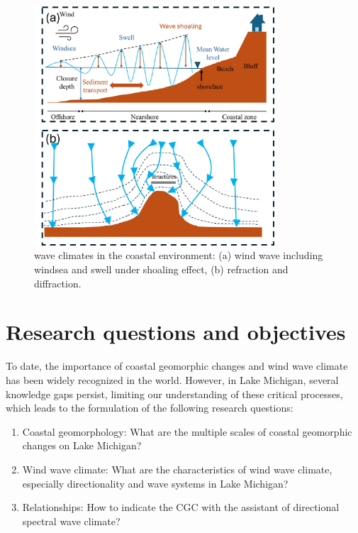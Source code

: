 \begin{figure}[htbp]
  \centering
  \includegraphics[width=0.8\textwidth]{chapter1/resources/figure1-5.jpg}
  \caption{wave climates in the coastal environment: (a) wind wave including windsea and swell under shoaling effect, (b) refraction and diffraction.}
  \label{fig:fig1.5}
\end{figure}


\section{Research questions and objectives}

To date, the importance of coastal geomorphic changes and wind wave climate has been widely recognized in the world. However, in Lake Michigan, several knowledge gaps persist, limiting our understanding of these critical processes, which leads to the formulation of the following research questions:

\begin{enumerate}
    \item Coastal geomorphology: What are the multiple scales of coastal geomorphic changes on Lake Michigan?
    \item Wind wave climate: What are the characteristics of wind wave climate, especially directionality and wave systems in Lake Michigan?
    \item Relationships: How to indicate the CGC with the assistant of directional spectral wave climate?
\end{enumerate}


